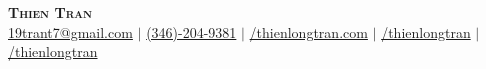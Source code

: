 \documentclass[letterpaper,11pt]{article}
\begin{document}
\def \linkedinicon {\faLinkedin}
\def \linkedinlink {https://www.linkedin.com/in/thienlongtran}
\def \linkedintext {/thienlongtran}

\def \emailicon {\faEnvelope}
\def \emaillink {mailto:19trant7@gmail.com}
\def \emailtext {19trant7@gmail.com}

\def \githubicon {\faGithub}
\def \githublink {https://github.com/thienlongtran}
\def \githubtext {/thienlongtran}

\def \websiteicon {\faGlobe}
\def \websitelink {https://www.thienlongtran.com/}
\def \websitetext {/thienlongtran.com}

\def \phoneicon {\faPhone}
\def \phonelink {tel:346-204-9381}
\def \phonetext {(346)-204-9381}


\def \linkedin {\linkedinicon\hspace{3pt}\textcolor{LinkColor}{\href{\linkedinlink}{\linkedintext}}}
\def \email {\emailicon\hspace{3pt}\textcolor{LinkColor}{\href{\emaillink}{\emailtext}}}

\def \github {\githubicon \hspace{3pt}\textcolor{LinkColor}{\href{\githublink}{\githubtext}}}

\def \website {\websiteicon\hspace{3pt}\textcolor{LinkColor}{\href{\websitelink}{\websitetext}}}

\def \phone {\phoneicon\hspace{3pt}\textcolor{LinkColor}{\href{\phonelink}{\phonetext}}}



\begin{center}
    \textbf{\Huge \scshape Thien Tran} \\ \vspace{1pt}
    {\email} $|$ 
    {\phone} $|$ 
    {\website} $|$
    {\linkedin} $|$
    {\github}
\end{center}
\end{document}
